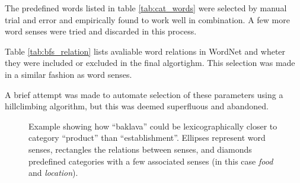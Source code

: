 \documentclass[a4paper,11pt]{kth-mag}
\begin{document}
The predefined words listed in table \ref{tab:cat_words} were selected by manual trial and error and empirically found to work well in combination. A few more word senses were tried and discarded in this process.

Table \ref{tab:bfs_relation} lists avaliable word relations in WordNet and wheter they were included or excluded in the final algortighm. This selection was made in a similar fashion as word senses.

A brief attempt was made to automate selection of these parameters using a hillclimbing algorithm, but this was deemed superfluous and abandoned.

\begin{figure}[t]
  \centering
  \caption{Example showing how ``baklava'' could be lexicographically closer to category ``product'' than ``establishment''. Ellipses represent word senses, rectangles the relations between senses, and diamonds predefined categories with a few associated senses (in this case \emph{food} and \emph{location}).}
  \label{fig:baklava_lex}
\end{figure}
\end{document}
